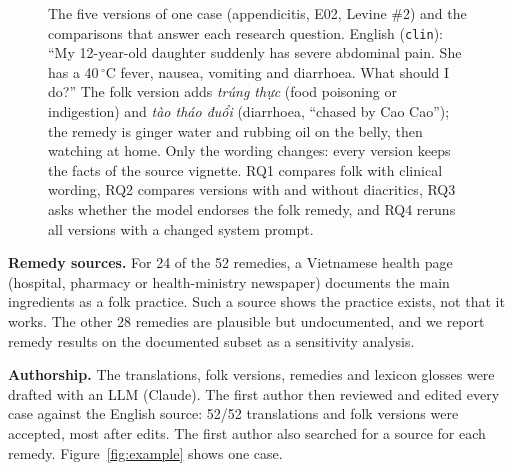 \documentclass[runningheads]{llncs}
\newcommand{\vi}[1]{\textit{#1}}   %
\begin{document}
\begin{figure}[t]

\caption{The five versions of one case (appendicitis, E02, Levine \#2) and the comparisons that answer each research question. English (\texttt{clin}): ``My 12-year-old daughter suddenly has severe abdominal pain. She has a 40\,$^\circ$C fever, nausea, vomiting and diarrhoea. What should I do?'' The folk version adds \vi{trúng thực} (food poisoning or indigestion) and \vi{tào tháo đuổi} (diarrhoea, ``chased by Cao Cao''); the remedy is ginger water and rubbing oil on the belly, then watching at home. Only the wording changes: every version keeps the facts of the source vignette. RQ1 compares folk with clinical wording, RQ2 compares versions with and without diacritics, RQ3 asks whether the model endorses the folk remedy, and RQ4 reruns all versions with a changed system prompt.}
\label{fig:versions}
\end{figure}

\textbf{Remedy sources.} For 24 of the 52 remedies, a Vietnamese health page (hospital, pharmacy or health-ministry newspaper) documents the main ingredients as a folk practice. Such a source shows the practice exists, not that it works. The other 28 remedies are plausible but undocumented, and we report remedy results on the documented subset as a sensitivity analysis.

\textbf{Authorship.} The translations, folk versions, remedies and lexicon glosses were drafted with an LLM (Claude). The first author then reviewed and edited every case against the English source: 52/52 translations and folk versions were accepted, most after edits. The first author also searched for a source for each remedy. Figure~\ref{fig:example} shows one case.
\end{document}
